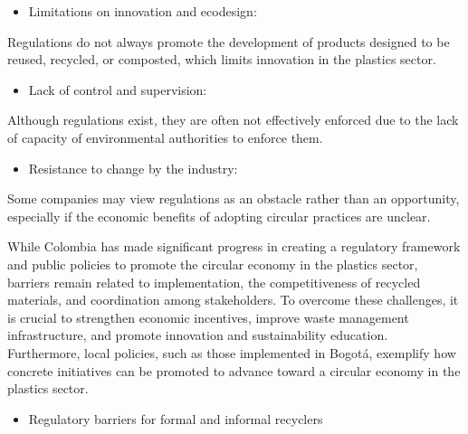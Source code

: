 \documentclass[
  12pt,
  oneside]{book}
\providecommand{\tightlist}{%
  \setlength{\itemsep}{0pt}\setlength{\parskip}{0pt}}
\begin{document}
\begin{itemize}
\tightlist
\item
  Limitations on innovation and ecodesign:
\end{itemize}

Regulations do not always promote the development of products designed
to be reused, recycled, or composted, which limits innovation in the
plastics sector.

\begin{itemize}
\tightlist
\item
  Lack of control and supervision:
\end{itemize}

Although regulations exist, they are often not effectively enforced due
to the lack of capacity of environmental authorities to enforce them.

\begin{itemize}
\tightlist
\item
  Resistance to change by the industry:
\end{itemize}

Some companies may view regulations as an obstacle rather than an
opportunity, especially if the economic benefits of adopting circular
practices are unclear.

While Colombia has made significant progress in creating a regulatory
framework and public policies to promote the circular economy in the
plastics sector, barriers remain related to implementation, the
competitiveness of recycled materials, and coordination among
stakeholders. To overcome these challenges, it is crucial to strengthen
economic incentives, improve waste management infrastructure, and
promote innovation and sustainability education. Furthermore, local
policies, such as those implemented in Bogotá, exemplify how concrete
initiatives can be promoted to advance toward a circular economy in the
plastics sector.

\begin{itemize}
\tightlist
\item
  Regulatory barriers for formal and informal recyclers
\end{itemize}
\end{document}
